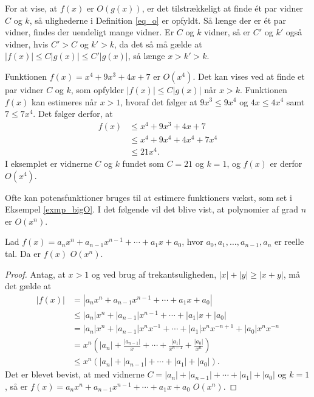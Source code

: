 For at vise, at $f(x)$ er $O(g(x))$, er det tilstrækkeligt at finde ét par vidner $C$ og $k$, så ulighederne i Definition \eqref{eq_o} er opfyldt. Så længe der er ét par vidner, findes der uendeligt mange vidner. Er $C$ og $k$ vidner, så er $C'$ og $k'$ også vidner, hvis $C'>C$ og $k'>k$, da det så må gælde at $|f(x)| \leq C |g(x)| \leq C' |g(x)| $, så længe $x>k'>k$.

\begin{exmp}\label{exmp_bigO}
	Funktionen $f(x)=x^4+9x^3+4x+7$ er $O(x^4)$.
	Det kan vises ved at finde et par vidner $C$ og $k$, som opfylder $|f(x)| \leq C |g(x)|$ når $x>k$.
	Funktionen $f(x)$ kan estimeres når $x>1$, hvoraf det følger at $9x^3\leq 9x^4$ og $4x\leq 4x^4$ samt $7\leq 7x^4$.
	Det følger derfor, at 
	\begin{align*}
		f(x) &\leq x^4+9x^3+4x+7 \\
		&\leq x^4+9x^4+4x^4+7x^4 \\
		&\leq 21x^4.
	\end{align*}
	I eksemplet er vidnerne $C$ og $k$ fundet som $C=21$ og $k=1$, og $f(x)$ er derfor $O(x^4)$. 
\end{exmp}

Ofte kan potensfunktioner bruges til at estimere funktioners vækst, som set i Eksempel \ref{exmp_bigO}. 
I det følgende vil det blive vist, at polynomier af grad $n$ er $O(x^n)$.

\begin{thm}
Lad $f(x)=a_nx^n+a_{n-1}x^{n-1}+\cdots +a_1x+a_0$, hvor $a_0, a_1, \dotsc, a_{n-1}, a_n$ er reelle tal. 
Da er $f(x)$ $O(x^n)$.
\label{thm_poly}
\end{thm}

\begin{proof}
Antag, at $x>1$ og ved brug af trekantsuligheden, $|x| + |y| \geq |x + y|$, må det gælde at
	\begin{align*}
		|f(x)| &= |a_nx^n+a_{n-1}x^{n-1}+ \cdots +a_1x+a_0| \\
		&\leq |a_n|x^n + |a_{n-1}| x^{n-1}+ \cdots + |a_1| x +|a_0| \\
		&= |a_n| x^n + |a_{n-1}| x^nx^{-1}+ \cdots + |a_1| x^n x^{-n+1}+|a_0| x^nx^{-n} \\
		&= x^n \left(|a_n| + \frac{|a_{n-1}|}{x}+ \cdots +\frac{|a_1|}{x^{n-1}}+\frac{|a_0|}{x^n} \right) \\
		&\leq x^n(|a_n| + |a_{n-1}| + \cdots + |a_1| + |a_0| ).
	\end{align*}
Det er blevet bevist, at med vidnerne $C= |a_n| + |a_{n-1}| + \cdots + |a_1| + |a_0|$ og $k=1$, så er $f(x)=a_nx^n+a_{n-1}x^{n-1}+\cdots +a_1x+a_0$ $O(x^n)$.
\end{proof}


